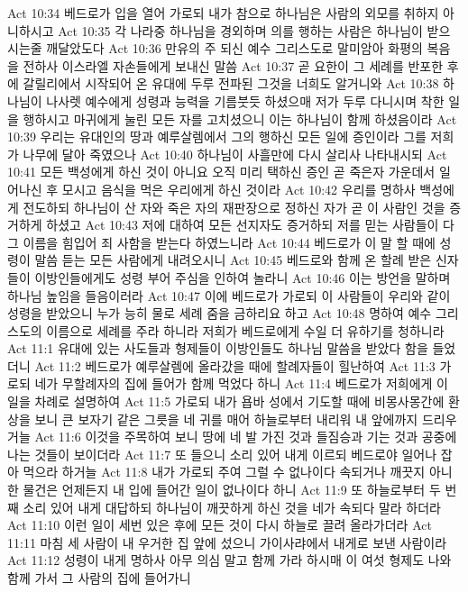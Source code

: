Act 10:34  베드로가 입을 열어 가로되 내가 참으로 하나님은 사람의 외모를 취하지 아니하시고
Act 10:35  각 나라중 하나님을 경외하며 의를 행하는 사람은 하나님이 받으시는줄 깨달았도다
Act 10:36  만유의 주 되신 예수 그리스도로 말미암아 화평의 복음을 전하사 이스라엘 자손들에게 보내신 말씀
Act 10:37  곧 요한이 그 세례를 반포한 후에 갈릴리에서 시작되어 온 유대에 두루 전파된 그것을 너희도 알거니와
Act 10:38  하나님이 나사렛 예수에게 성령과 능력을 기름붓듯 하셨으매 저가 두루 다니시며 착한 일을 행하시고 마귀에게 눌린 모든 자를 고치셨으니 이는 하나님이 함께 하셨음이라
Act 10:39  우리는 유대인의 땅과 예루살렘에서 그의 행하신 모든 일에 증인이라 그를 저희가 나무에 달아 죽였으나
Act 10:40  하나님이 사흘만에 다시 살리사 나타내시되
Act 10:41  모든 백성에게 하신 것이 아니요 오직 미리 택하신 증인 곧 죽은자 가운데서 일어나신 후 모시고 음식을 먹은 우리에게 하신 것이라
Act 10:42  우리를 명하사 백성에게 전도하되 하나님이 산 자와 죽은 자의 재판장으로 정하신 자가 곧 이 사람인 것을 증거하게 하셨고
Act 10:43  저에 대하여 모든 선지자도 증거하되 저를 믿는 사람들이 다 그 이름을 힘입어 죄 사함을 받는다 하였느니라
Act 10:44  베드로가 이 말 할 때에 성령이 말씀 듣는 모든 사람에게 내려오시니
Act 10:45  베드로와 함께 온 할례 받은 신자들이 이방인들에게도 성령 부어 주심을 인하여 놀라니
Act 10:46  이는 방언을 말하며 하나님 높임을 들음이러라
Act 10:47  이에 베드로가 가로되 이 사람들이 우리와 같이 성령을 받았으니 누가 능히 물로 세례 줌을 금하리요 하고
Act 10:48  명하여 예수 그리스도의 이름으로 세례를 주라 하니라 저희가 베드로에게 수일 더 유하기를 청하니라
Act 11:1  유대에 있는 사도들과 형제들이 이방인들도 하나님 말씀을 받았다 함을 들었더니
Act 11:2  베드로가 예루살렘에 올라갔을 때에 할례자들이 힐난하여
Act 11:3  가로되 네가 무할례자의 집에 들어가 함께 먹었다 하니
Act 11:4  베드로가 저희에게 이 일을 차례로 설명하여
Act 11:5  가로되 내가 욥바 성에서 기도할 때에 비몽사몽간에 환상을 보니 큰 보자기 같은 그릇을 네 귀를 매어 하늘로부터 내리워 내 앞에까지 드리우거늘
Act 11:6  이것을 주목하여 보니 땅에 네 발 가진 것과 들짐승과 기는 것과 공중에 나는 것들이 보이더라
Act 11:7  또 들으니 소리 있어 내게 이르되 베드로야 일어나 잡아 먹으라 하거늘
Act 11:8  내가 가로되 주여 그럴 수 없나이다 속되거나 깨끗지 아니한 물건은 언제든지 내 입에 들어간 일이 없나이다 하니
Act 11:9  또 하늘로부터 두 번째 소리 있어 내게 대답하되 하나님이 깨끗하게 하신 것을 네가 속되다 말라 하더라
Act 11:10  이런 일이 세번 있은 후에 모든 것이 다시 하늘로 끌려 올라가더라
Act 11:11  마침 세 사람이 내 우거한 집 앞에 섰으니 가이사랴에서 내게로 보낸 사람이라
Act 11:12  성령이 내게 명하사 아무 의심 말고 함께 가라 하시매 이 여섯 형제도 나와 함께 가서 그 사람의 집에 들어가니

